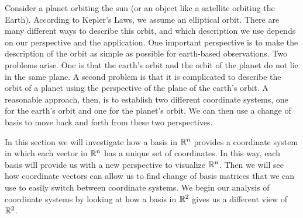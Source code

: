   \label{sec:coordinate_vectors}

\vspace*{-17 pt}

\vspace*{13 pt}


Consider a planet orbiting the sun (or an object like a satellite orbiting the Earth). According to Kepler's Laws, we assume an elliptical orbit. There are many different ways to describe this orbit, and which description we use depends on our perspective and the application. One important perspective is to make the description of the orbit as simple as possible for earth-based observations. Two problems arise. One is that the earth's orbit and the orbit of the planet do not lie in the same plane. A second problem is that it is complicated to describe the orbit of a planet using the perspective of the plane of the earth's orbit. A reasonable approach, then, is to establish two different coordinate systems, one for the earth's orbit and one for the planet's orbit. We can then use a change of basis to move back and forth from these two perspectives. 



In this section we will investigate how a basis in $\mathbb{R}^n$ provides a coordinate system in which each vector in $\mathbb{R}^n$ has a unique set of coordinates. In this way, each basis will provide us with a new perspective to visualize $\mathbb{R}^n$. Then we will see how coordinate vectors can allow us to find change of basis matrices that we can use to easily switch between coordinate systems. We begin our analysis of coordinate systems by looking at how a basis in $\mathbb{R}^2$ gives us a different view of $\mathbb{R}^2$. 

